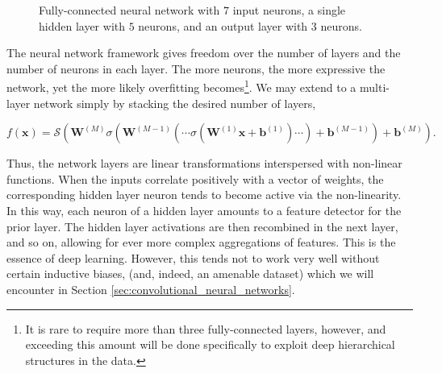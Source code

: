 \begin{figure}

\caption{Fully-connected neural network with $7$ input neurons, a single hidden layer with $5$ neurons, and an output layer with $3$ neurons.}
\label{fig:neural_network}
\end{figure}

The neural network framework gives freedom over the number of layers and the number of neurons in each layer. The more neurons, the more expressive the network, yet the more likely overfitting becomes\footnote{It is rare to require more than three fully-connected layers, however, and exceeding this amount will be done specifically to exploit deep hierarchical structures in the data.}. We may extend to a multi-layer network simply by stacking the desired number of layers,

\begin{equation}
f(\mathbf{x}) = \mathcal{S}(\mathbf{W}^{(M)}\sigma(\mathbf{W}^{(M-1)}(\cdots\sigma(\mathbf{W}^{(1)}\mathbf{x} + \mathbf{b}^{(1)})\cdots) + \mathbf{b}^{(M-1)})  + \mathbf{b}^{(M)}).
\end{equation}

Thus, the network layers are linear transformations interspersed with non-linear functions. When the inputs correlate positively with a vector of weights, the corresponding hidden layer neuron tends to become active via the non-linearity. In this way, each neuron of a hidden layer amounts to a feature detector for the prior layer. The hidden layer activations are then recombined in the next layer, and so on, allowing for ever more complex aggregations of features. This is the essence of deep learning. However, this tends not to work very well without certain inductive biases, (and, indeed, an amenable dataset) which we will encounter in Section \ref{sec:convolutional_neural_networks}.

